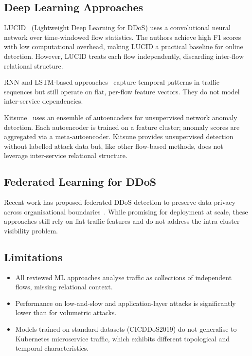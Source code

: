 \subsection{Deep Learning Approaches}

LUCID~\cite{lucid2020} (Lightweight Deep Learning for DDoS) uses a convolutional neural
network over time-windowed flow statistics. The authors achieve high F1 scores with low
computational overhead, making LUCID a practical baseline for online detection. However,
LUCID treats each flow independently, discarding inter-flow relational structure.

RNN and LSTM-based approaches~\cite{lstm_ddos} capture temporal patterns in traffic
sequences but still operate on flat, per-flow feature vectors. They do not model
inter-service dependencies.

Kitsune~\cite{mirsky2018kitsune} uses an ensemble of autoencoders for unsupervised
network anomaly detection. Each autoencoder is trained on a feature cluster; anomaly
scores are aggregated via a meta-autoencoder. Kitsune provides unsupervised detection
without labelled attack data but, like other flow-based methods, does not leverage
inter-service relational structure.

\subsection{Federated Learning for DDoS}

Recent work has proposed federated DDoS detection to preserve data privacy across
organisational boundaries~\cite{federated_ddos}. While promising for deployment at
scale, these approaches still rely on flat traffic features and do not address the
intra-cluster visibility problem.

\subsection{Limitations}

\begin{itemize}
  \item All reviewed ML approaches analyse traffic as collections of independent flows,
  missing relational context.
  \item Performance on low-and-slow and application-layer attacks is significantly lower
  than for volumetric attacks.
  \item Models trained on standard datasets (CICDDoS2019) do not generalise to
  Kubernetes microservice traffic, which exhibits different topological and temporal
  characteristics.
\end{itemize}

